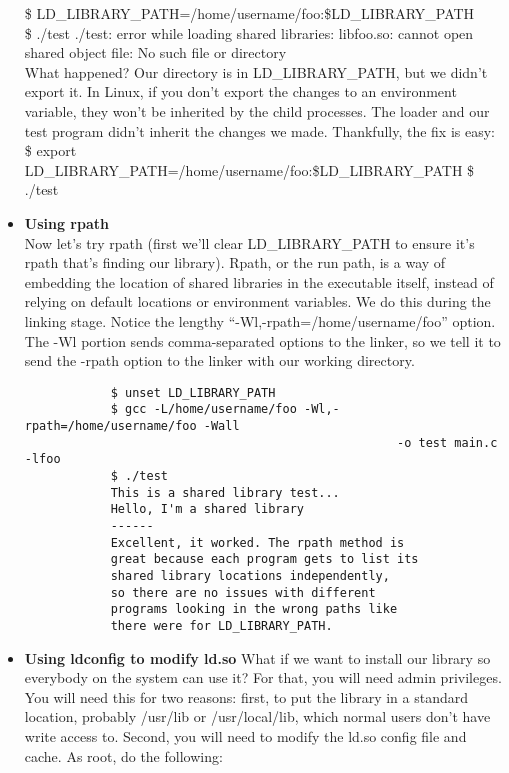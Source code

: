 \documentclass[a4paper, 12pt]{article}
\begin{document}
\begin{itemize}
            \$ LD\_LIBRARY\_PATH=/home/username/foo:\$LD\_LIBRARY\_PATH\\
            \textsf{\$ ./test
            ./test: error while loading shared libraries: libfoo.so: cannot open shared object file: No such file or directory}\\
            What happened? Our directory is in LD\_LIBRARY\_PATH, but we didn’t export it. In Linux, if you don’t export the changes to an environment variable, they won’t be inherited by the child processes. The loader and our test program didn’t inherit the changes we made. Thankfully, the fix is easy:\\
            \textsf{
                \$ export LD\_LIBRARY\_PATH=/home/username/foo:\$LD\_LIBRARY\_PATH
                \$ ./test
            }
        \item \textbf{Using rpath}\\
            Now let’s try rpath (first we’ll clear LD\_LIBRARY\_PATH to ensure it’s rpath that’s finding our library). Rpath, or the run path, is a way of embedding the location of shared libraries in the executable itself, instead of relying on default locations or environment variables. We do this during the linking stage. Notice the lengthy “-Wl,-rpath=/home/username/foo” option. The -Wl portion sends comma-separated options to the linker, so we tell it to send the -rpath option to the
            linker with our working directory.\\
            \begin{verbatim}
            $ unset LD_LIBRARY_PATH
            $ gcc -L/home/username/foo -Wl,-rpath=/home/username/foo -Wall 
                                                    -o test main.c -lfoo
            $ ./test
            This is a shared library test...
            Hello, I'm a shared library
            ------
            Excellent, it worked. The rpath method is
            great because each program gets to list its 
            shared library locations independently, 
            so there are no issues with different 
            programs looking in the wrong paths like 
            there were for LD_LIBRARY_PATH.
            \end{verbatim}
        \item \textbf{Using ldconfig to modify ld.so}
            What if we want to install our library so everybody on the system can use it? For that, you will need admin privileges. You will need this for two reasons: first, to put the library in a standard location, probably /usr/lib or /usr/local/lib, which normal users don’t have write access to. Second, you will need to modify the ld.so config file and cache. As root, do the following:\\

\end{itemize}
\end{document}
